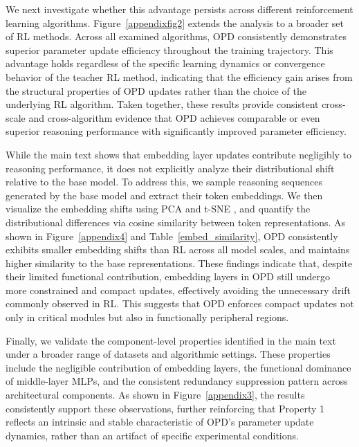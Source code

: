 \documentclass{llmxive}
\begin{document}
We next investigate whether this advantage persists across different reinforcement learning algorithms. Figure~\ref{appendixfig2} extends the analysis to a broader set of RL methods. Across all examined algorithms, OPD consistently demonstrates superior parameter update efficiency throughout the training trajectory. This advantage holds regardless of the specific learning dynamics or convergence behavior of the teacher RL method, indicating that the efficiency gain arises from the structural properties of OPD updates rather than the choice of the underlying RL algorithm. Taken together, these results provide consistent cross-scale and cross-algorithm evidence that OPD achieves comparable or even superior reasoning performance with significantly improved parameter efficiency.

While the main text shows that embedding layer updates contribute negligibly to reasoning performance, it does not explicitly analyze their distributional shift relative to the base model. To address this, we sample reasoning sequences generated by the base model and extract their token embeddings. We then visualize the embedding shifts using PCA \citep{Eckart1936TheAO} and t-SNE \citep{shi2021visualizingdatausinggtsne}, and quantify the distributional differences via cosine similarity between token representations. As shown in Figure~\ref{appendix4} and Table~\ref{embed_similarity}, OPD consistently exhibits smaller embedding shifts than RL across all model scales, and maintains higher similarity to the base representations. These findings indicate that, despite their limited functional contribution, embedding layers in OPD still undergo more constrained and compact updates, effectively avoiding the unnecessary drift commonly observed in RL. This suggests that OPD enforces compact updates not only in critical modules but also in functionally peripheral regions.

Finally, we validate the component-level properties identified in the main text under a broader range of datasets and algorithmic settings. These properties include the negligible contribution of embedding layers, the functional dominance of middle-layer MLPs, and the consistent redundancy suppression pattern across architectural components. As shown in Figure~\ref{appendix3}, the results consistently support these observations, further reinforcing that Property 1 reflects an intrinsic and stable characteristic of OPD's parameter update dynamics, rather than an artifact of specific experimental conditions.
\end{document}
